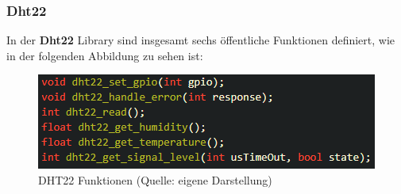 \subsubsection{Dht22}\label{sec:esp-idf-libraries-dht22}

In der \textbf{Dht22} Library sind insgesamt sechs öffentliche Funktionen definiert, wie in der folgenden Abbildung zu sehen ist:

\begin{figure}[H]
    \begin{center}
        \includegraphics[scale=1]{images/dht22_functions.png}
        \caption{DHT22 Funktionen (Quelle: eigene Darstellung)}
        \label{abb:dht22_funcionts}
    \end{center}    
\end{figure}

